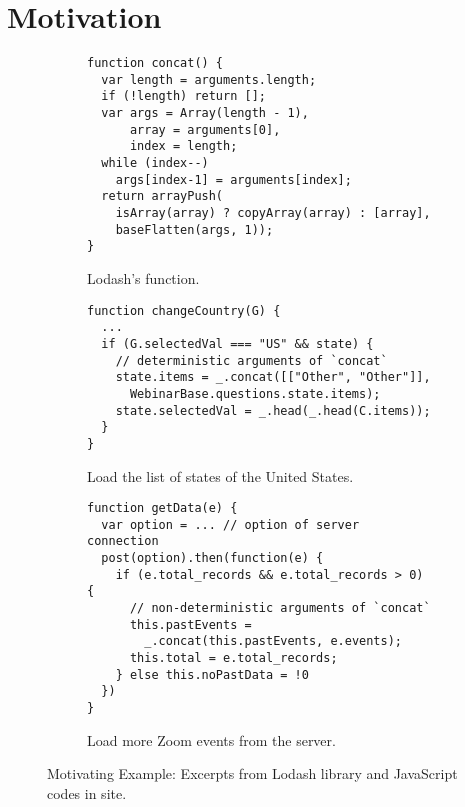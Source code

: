 \section{Motivation}\label{sec:motivation}

\begin{figure}[t]
  \centering
  \begin{subfigure}[t]{0.5\textwidth}
    \begin{lstlisting}[style=myJSstyle]
function concat() {
  var length = arguments.length;
  if (!length) return [];
  var args = Array(length - 1),
      array = arguments[0],
      index = length;
  while (index--)
    args[index-1] = arguments[index];
  return arrayPush(
    isArray(array) ? copyArray(array) : [array],
    baseFlatten(args, 1));
}
    \end{lstlisting}
    \vspace*{-1em}
    \caption{Lodash's  function.}
    \label{fig:concat}
  \end{subfigure}
  \begin{subfigure}[t]{0.5\textwidth}
    \begin{lstlisting}[style=myJSstyle,firstnumber=13]
function changeCountry(G) {
  ...
  if (G.selectedVal === "US" && state) {
    // deterministic arguments of `concat`
    state.items = _.concat([["Other", "Other"]],
      WebinarBase.questions.state.items);
    state.selectedVal = _.head(_.head(C.items));
  }
}
    \end{lstlisting}
    \vspace*{-1em}
    \caption{Load the list of states of the United States.}
    \label{fig:changeCountry}
  \end{subfigure}
  \begin{subfigure}[t]{0.5\textwidth}
    \begin{lstlisting}[style=myJSstyle,firstnumber=22]
function getData(e) {
  var option = ... // option of server connection
  post(option).then(function(e) {
    if (e.total_records && e.total_records > 0) {
      // non-deterministic arguments of `concat`
      this.pastEvents =
        _.concat(this.pastEvents, e.events);
      this.total = e.total_records;
    } else this.noPastData = !0
  })
}
    \end{lstlisting}
    \vspace*{-1em}
    \caption{Load more Zoom events from the server.}
    \label{fig:getData}
  \end{subfigure}
  \vspace*{-1em}
  \caption{Motivating Example: Excerpts from Lodash library and JavaScript codes
  in  site.}
  \label{fig:example}
\end{figure}


